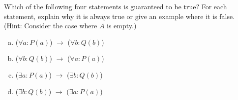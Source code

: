 \documentclass[12pt]{article}
\begin{document}
	Which of the following four statements is guaranteed to be true? For each statement,
	explain why it is always true or give an example where it is false. (Hint: Consider
	the case where $A$ is empty.)
	\begin{enumerate}[(a)]
		\item ($\forall a : P(a)$) $\rightarrow$ ($\forall b : Q(b)$)

		\item ($\forall b : Q(b)$) $\rightarrow$ ($\forall a : P(a)$)

		\item ($\exists a : P(a)$) $\rightarrow$ ($\exists b : Q(b)$)

		\item ($\exists b : Q(b)$) $\rightarrow$ ($\exists a : P(a)$)
	\end{enumerate}
\end{document}
